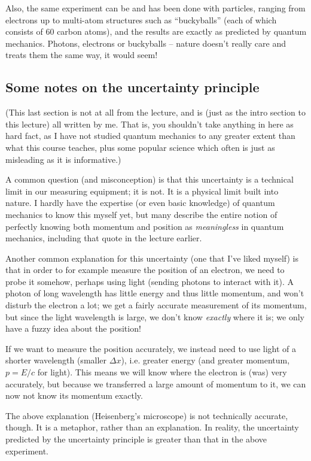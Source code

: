 Also, the same experiment can be and has been done with particles, ranging from electrons up to multi-atom structures such as ``buckyballs'' (each of which consists of 60 carbon atoms), and the results are exactly as predicted by quantum mechanics. Photons, electrons or buckyballs -- nature doesn't really care and treats them the same way, it would seem!

\subsection{Some notes on the uncertainty principle}

(This last section is not at all from the lecture, and is (just as the intro section to this lecture) all written by me. That is, you shouldn't take anything in here as hard fact, as I have not studied quantum mechanics to any greater extent than what this course teaches, plus some popular science which often is just as misleading as it is informative.)

A common question (and misconception) is that this uncertainty is a technical limit in our measuring equipment; it is not. It is a physical limit built into nature. I hardly have the expertise (or even basic knowledge) of quantum mechanics to know this myself yet, but many describe the entire notion of perfectly knowing both momentum and position as \emph{meaningless} in quantum mechanics, including that quote in the lecture earlier.

Another common explanation for this uncertainty (one that I've liked myself) is that in order to for example measure the position of an electron, we need to probe it somehow, perhaps using light (sending photons to interact with it). A photon of long wavelength has little energy and thus little momentum, and won't disturb the electron a lot; we get a fairly accurate measurement of its momentum, but since the light wavelength is large, we don't know \emph{exactly} where it is; we only have a fuzzy idea about the position!

If we want to measure the position accurately, we instead need to use light of a shorter wavelength (smaller $\Delta x$), i.e. greater energy (and greater momentum, $p = E/c$ for light). This means we will know where the electron is (was) very accurately, but because we transferred a large amount of momentum to it, we can now not know its momentum exactly.

The above explanation (Heisenberg's microscope) is not technically accurate, though. It is a metaphor, rather than an explanation. In reality, the uncertainty predicted by the uncertainty principle is greater than that in the above experiment.

